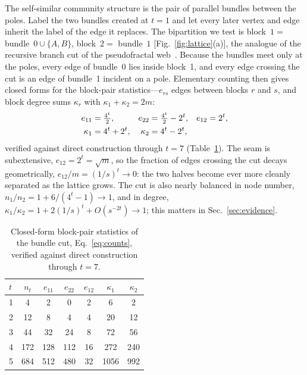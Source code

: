 \documentclass[preprint,12pt]{elsarticle}
\newcommand{\Nof}{n_t}
\begin{document}
The self-similar community structure is the pair of parallel bundles between
the poles. Label the two bundles created at $t=1$ and let every later vertex
and edge inherit the label of the edge it replaces. The bipartition we test is
block~$1=$ bundle~$0\cup\{A,B\}$, block~$2=$ bundle~$1$
[Fig.~\ref{fig:lattice}(a)], the analogue of the recursive branch cut of the
pseudofractal web~\cite{vazquez2026communitystructurepseudofractalweb}. Because
the bundles meet only at the poles, every edge of bundle~0 lies inside block~1,
and every edge crossing the cut is an edge of bundle~1 incident on a pole. Elementary counting then
gives closed forms for the block-pair statistics---$e_{rs}$ edges between
blocks $r$ and $s$, and block degree sums $\kappa_r$ with
$\kappa_1+\kappa_2=2m$:
\begin{align}
  e_{11} &= \tfrac{4^t}{2}, &
  e_{22} &= \tfrac{4^t}{2}-2^t, &
  e_{12} &= 2^t, \notag\\
  \kappa_1 &= 4^t+2^t, &
  \kappa_2 &= 4^t-2^t, &&
  \label{eq:counts}
\end{align}
verified against direct construction through $t=7$ (Table~\ref{tab:counts}).
The seam is subextensive, $e_{12}=2^t=\sqrt{m}$, so the fraction of edges
crossing the cut decays geometrically, $e_{12}/m=(1/s)^t\to0$: the two halves
become ever more cleanly separated as the lattice grows. The cut is also
nearly balanced in node number, $n_1/n_2=1+6/(4^t-1)\to1$, and in degree,
$\kappa_1/\kappa_2=1+2(1/s)^t+O(s^{-2t})\to1$; this matters in
Sec.~\ref{sec:evidence}.

\begin{table}[tb]
  \centering
  \caption{Closed-form block-pair statistics of the bundle cut,
  Eq.~\eqref{eq:counts}, verified against direct construction through $t=7$.}
  \label{tab:counts}
  \begin{tabular}{lcccccc}
    \toprule
    $t$ & $\Nof$ & $e_{11}$ & $e_{22}$ & $e_{12}$ & $\kappa_1$ & $\kappa_2$\\
    \midrule
    1 & 4    & 2    & 0    & 2  & 6    & 2   \\
    2 & 12   & 8    & 4    & 4  & 20   & 12  \\
    3 & 44   & 32   & 24   & 8  & 72   & 56  \\
    4 & 172  & 128  & 112  & 16 & 272  & 240 \\
    5 & 684  & 512  & 480  & 32 & 1056 & 992 \\
    \bottomrule
  \end{tabular}
\end{table}
\end{document}
